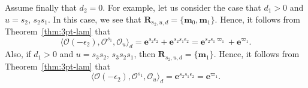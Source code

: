 \documentclass[11pt,a4paper,reqno,dvipdfmx]{amsart}
\numberwithin{equation}{section}
\newcommand{\CO}{\mathcal{O}}
\newcommand{\vpi}{\varpi}
\newcommand{\eps}{\epsilon}
\newcommand{\be}{\mathbf{e}}
\newcommand{\bm}{\mathbf{m}}
\newcommand{\bfR}{\mathbf{R}}
\theoremstyle{plain}
\theoremstyle{definition}
\theoremstyle{remark}
\begin{document}
Assume finally that $d_{2} = 0$. For example, let us consider the case 
that $d_{1} > 0$ and $u = s_{2},\,s_{2}s_{1}$. In this case, we see that 
$\bfR_{s_{2},u,d} = \bigl\{ \bm_{0}, \bm_{1} \bigr\}$. Hence, it follows from Theorem~\ref{thm:3pt-lam} that 
%
\begin{equation*}
\langle \CO(- \eps_{2}),\CO^{s_{1}},\CO_{u} \rangle_{d} = 
\be^{s_{2}\eps_{2}} + \be^{s_{2}s_{1}\eps_{2}} = 
\be^{s_{2}s_{1}\vpi_{1}} + \be^{\vpi_{1}}. 
\end{equation*}
%
Also, if $d_{1} > 0$ and $u = s_{3}s_{2},\,s_{3}s_{2}s_{1}$, then $\bfR_{s_{2},u,d} = 
\bigl\{ \bm_{1} \bigr\}$. Hence, it follows from Theorem~\ref{thm:3pt-lam} that 
%
\begin{equation*}
\langle \CO(- \eps_{2}),\CO^{s_{1}},\CO_{u} \rangle_{d} = \be^{s_{2}s_{1}\eps_{2}} 
= \be^{\vpi_{1}}.
\end{equation*}
%
\end{document}
